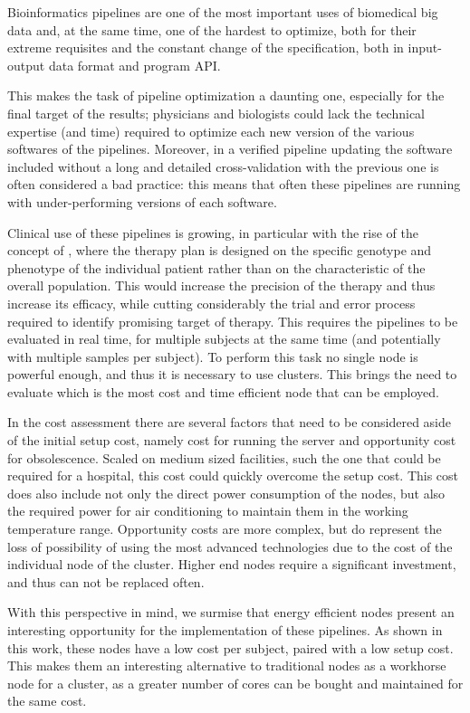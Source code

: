\documentclass{standalone}
\begin{document}
Bioinformatics pipelines are one of the most important uses of biomedical big data and, at the same time, one of the hardest to optimize, both for their extreme requisites and the constant change of the specification, both in input-output data format and program API.

This makes the task of pipeline optimization a daunting one, especially for the final target of the results; physicians and biologists could lack the technical expertise (and time) required to optimize each new version of the various softwares of the pipelines.
Moreover, in a verified pipeline updating the software included without a long and detailed cross-validation with the previous one is often considered a bad practice: this means that often these pipelines are running with under-performing versions of each software.

Clinical use of these pipelines is growing, in particular with the rise of the concept of , where the therapy plan is designed on the specific genotype and phenotype of the individual patient rather than on the characteristic of the overall population.
This would increase the precision of the therapy and thus increase its efficacy, while cutting considerably the trial and error process required to identify promising target of therapy.
This requires the pipelines to be evaluated in real time, for multiple subjects at the same time (and potentially with multiple samples per subject).
To perform this task no single node is powerful enough, and thus it is necessary to use clusters.
This brings the need to evaluate which is the most cost and time efficient node that can be employed.

In the cost assessment there are several factors that need to be considered aside of the initial setup cost, namely cost for running the server and opportunity cost for obsolescence.
Scaled on medium sized facilities, such the one that could be required for a hospital, this cost could quickly overcome the setup cost.
This cost does also include not only the direct power consumption of the nodes, but also the required power for air conditioning to maintain them in the working temperature range.
Opportunity costs are more complex, but do represent the loss of possibility of using the most advanced technologies due to the cost of the individual node of the cluster.
Higher end nodes require a significant investment, and thus can not be replaced often.

With this perspective in mind, we surmise that energy efficient nodes present an interesting opportunity for the implementation of these pipelines.
As shown in this work, these nodes have a low cost per subject, paired with a low setup cost.
This makes them an interesting alternative to traditional nodes as a workhorse node for a cluster, as a greater number of cores can be bought and maintained for the same cost.
\end{document}

